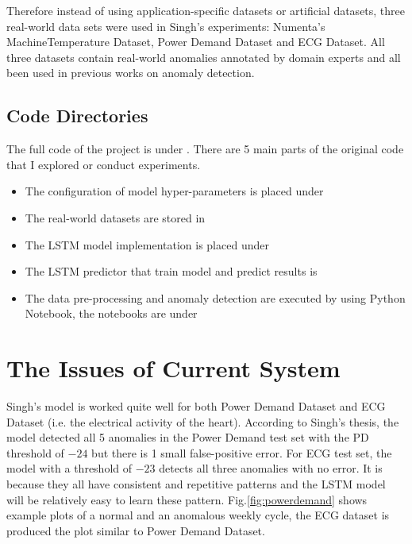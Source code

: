 \documentclass{article}
\begin{document}
Therefore instead of using application-specific datasets or artificial
datasets, three real-world data sets were used in Singh's experiments:
Numenta’s MachineTemperature Dataset, Power Demand Dataset and ECG Dataset. All
three datasets contain real-world anomalies annotated by domain experts and all
been used in previous works on anomaly detection.


\subsection{Code Directories}
The full code of the project is under . There are 5 main parts
of the original code that I explored or conduct experiments.

\begin{itemize}
	\setlength{\itemsep}{1pt}
	\setlength{\parskip}{0pt}
	\setlength{\parsep}{0pt}
	\item The configuration of model hyper-parameters is placed under
	\item The real-world datasets are stored in 
	\item The LSTM model implementation is placed under 
	\item The LSTM predictor that train model and predict results is
	\item The data pre-processing and anomaly detection are executed by using
Python Notebook, the notebooks are under 
\end{itemize}


\section{The Issues of Current System}

Singh's model is worked quite well for both Power Demand Dataset and
ECG Dataset (i.e. the electrical activity of the heart). According to Singh's
thesis, the model detected all 5 anomalies in the Power Demand test set with
the PD threshold of $-24$ but there is 1 small false-positive error. For ECG
test
set, the model with a threshold of $-23$ detects all three anomalies with no
error. It is because they all have consistent and repetitive patterns and the
LSTM model will be relatively easy to learn these pattern.
Fig.\ref{fig:powerdemand} shows example plots of a normal and an anomalous
weekly cycle, the ECG dataset is produced the plot similar to Power Demand
Dataset.
\end{document}
